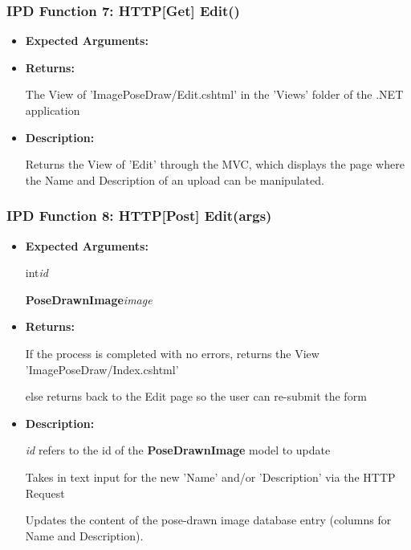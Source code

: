 \documentclass{scrreprt}
\begin{document}
\subsubsection{IPD Function 7: HTTP[Get] Edit()}

\begin{itemize}
        \item \textbf{Expected Arguments:}
        \item \textbf{Returns:}

                The View of 'ImagePoseDraw/Edit.cshtml' in the 'Views' folder
                of the .NET application

        \item \textbf{Description:}

                Returns the View of 'Edit' through the MVC, which displays the
                page where the Name and Description of an upload can be
                manipulated.
\end{itemize}


\subsubsection{IPD Function 8: HTTP[Post] Edit(args)}

\begin{itemize}
        \item \textbf{Expected Arguments:}

                int\quad\textit{id}

                \textbf{PoseDrawnImage}\quad\textit{image}

        \item \textbf{Returns:}

                If the process is completed with no errors, returns the View
                'ImagePoseDraw/Index.cshtml'

                else returns back to the Edit page so the user can re-submit
                the form

        \item \textbf{Description:}

                \textit{id} refers to the id of the \textbf{PoseDrawnImage}
                model to update

                Takes in text input for the new 'Name' and/or 'Description' via
                the HTTP Request

                Updates the content of the pose-drawn image database entry
                (columns for Name and Description).

\end{itemize}
\end{document}
